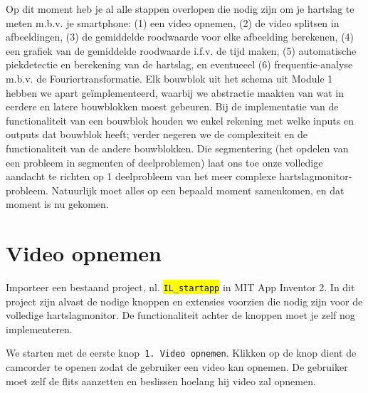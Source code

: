 
\begin{samenvatting}
	Op dit moment heb je al alle stappen overlopen die nodig zijn om je hartslag te meten m.b.v. je smartphone: (1) een video opnemen, (2) de video splitsen in afbeeldingen, (3) de gemiddelde roodwaarde voor elke afbeelding berekenen, (4) een grafiek van de gemiddelde roodwaarde i.f.v. de tijd maken, (5) automatische piekdetectie en berekening van de hartslag, en eventueeel (6) frequentie-analyse m.b.v. de Fouriertransformatie. 
	Elk bouwblok uit het schema uit Module 1 hebben we apart ge\"implementeerd, waarbij we abstractie maakten van wat in eerdere en latere bouwblokken moest gebeuren.
	Bij de implementatie van de functionaliteit van een bouwblok houden we enkel rekening met welke inputs en outputs dat bouwblok heeft; verder negeren we de complexiteit en de functionaliteit van de andere bouwblokken.
	Die segmentering (het opdelen van een probleem in segmenten of deelproblemen) laat ons toe onze volledige aandacht te richten op 1 deelprobleem van het meer complexe hartslagmonitor-probleem.
	Natuurlijk moet alles op een bepaald moment samenkomen, en dat moment is nu gekomen.
\end{samenvatting}
%

\section{Video opnemen}
\label{sec:Mod5_Sec1}
%
Importeer een bestaand project, nl. \hl{\texttt{IL\_startapp}} in MIT App Inventor 2. 
In dit project zijn alvast de nodige knoppen en extensies voorzien die nodig zijn voor de volledige hartslagmonitor. 
De functionaliteit achter de knoppen moet je zelf nog implementeren.

We starten met de eerste knop\texttt{ 1. Video opnemen}. Klikken op de knop dient de camcorder te openen zodat de gebruiker een video kan opnemen. De gebruiker moet zelf de flits aanzetten en beslissen hoelang hij video zal opnemen.


